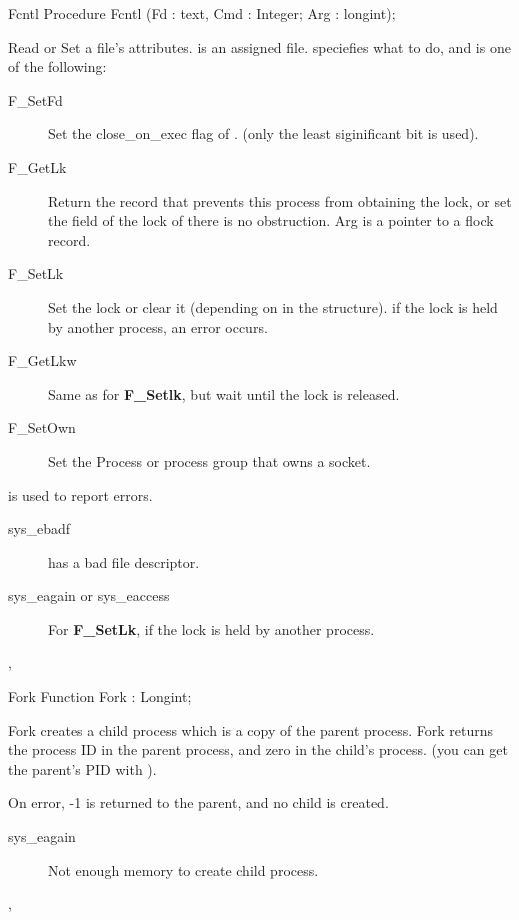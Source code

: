 \begin{procedure}{Fcntl}
\Declaration
Procedure Fcntl (Fd :  text, Cmd : Integer; Arg : longint);

\Description

Read or Set a file's attributes.  is an assigned file.
 speciefies what to do, and is one of the following:
\begin{description}
\item[F\_SetFd] Set the close\_on\_exec flag of . (only the least
siginificant bit is used).
\item[F\_GetLk] Return the  record that prevents this process from
obtaining the lock, or set the  field of the lock of there is no
obstruction. Arg is a pointer to a flock record.
\item[F\_SetLk] Set the lock or clear it (depending on  in the
 structure). if the lock is held by another process, an error
occurs.
\item[F\_GetLkw] Same as for \textbf{F\_Setlk}, but wait until the lock is
released.
\item[F\_SetOwn] Set the Process or process group that owns a socket.
\end{description}

\Errors

 is used to report errors.
\begin{description}
\item[sys\_ebadf]  has a bad file descriptor.
\item[sys\_eagain or sys\_eaccess] For \textbf{F\_SetLk}, if the lock is
held by another process.
\end{description}

\SeeAlso
{},  
\end{procedure}
\begin{function}{Fork}
\Declaration
Function Fork  : Longint;

\Description

Fork creates a child process which is a copy of the parent process.
Fork returns the process ID in the parent process, and zero in the child's
process. (you can get the parent's PID with ).

\Errors
On error, -1 is returned to the parent, and no child is created.
\begin{description}
\item [sys\_eagain] Not enough memory to create child process.
\end{description}

\SeeAlso
{}, 
\end{function}
